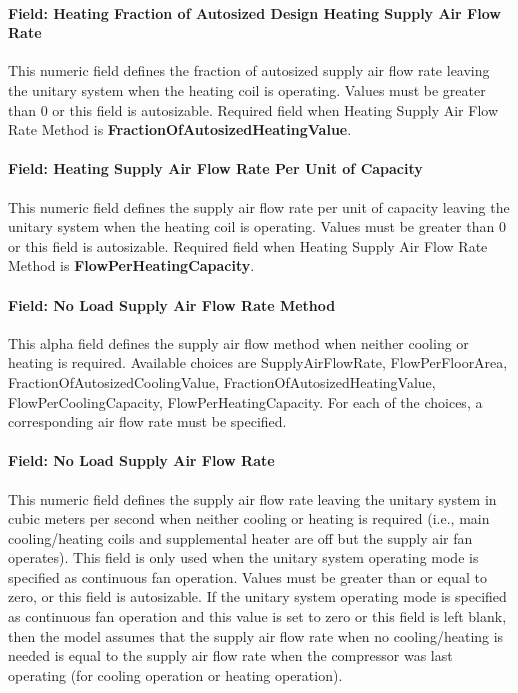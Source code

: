 \paragraph{Field: Heating Fraction of Autosized Design Heating Supply Air Flow Rate}\label{field-heating-fraction-of-autosized-design-heating-supply-air-flow-rate}

This numeric field defines the fraction of autosized supply air flow rate leaving the unitary system when the heating coil is operating. Values must be greater than 0 or this field is autosizable. Required field when Heating Supply Air Flow Rate Method is \textbf{FractionOfAutosizedHeatingValue}.

\paragraph{Field: Heating Supply Air Flow Rate Per Unit of Capacity}\label{field-heating-supply-air-flow-rate-per-unit-of-capacity}

This numeric field defines the supply air flow rate per unit of capacity leaving the unitary system when the heating coil is operating. Values must be greater than 0 or this field is autosizable. Required field when Heating Supply Air Flow Rate Method is \textbf{FlowPerHeatingCapacity}.

\paragraph{Field: No Load Supply Air Flow Rate Method}\label{field-no-load-supply-air-flow-rate-method}

This alpha field defines the supply air flow method when neither cooling or heating is required. Available choices are SupplyAirFlowRate, FlowPerFloorArea, FractionOfAutosizedCoolingValue, FractionOfAutosizedHeatingValue, FlowPerCoolingCapacity, FlowPerHeatingCapacity. For each of the choices, a corresponding air flow rate must be specified.

\paragraph{Field: No Load Supply Air Flow Rate}\label{field-no-load-supply-air-flow-rate-000}

This numeric field defines the supply air flow rate leaving the unitary system in cubic meters per second when neither cooling or heating is required (i.e., main cooling/heating coils and supplemental heater are off but the supply air fan operates). This field is only used when the unitary system operating mode is specified as continuous fan operation. Values must be greater than or equal to zero, or this field is autosizable. If the unitary system operating mode is specified as continuous fan operation and this value is set to zero or this field is left blank, then the model assumes that the supply air flow rate when no cooling/heating is needed is equal to the supply air flow rate when the compressor was last operating (for cooling operation or heating operation).

